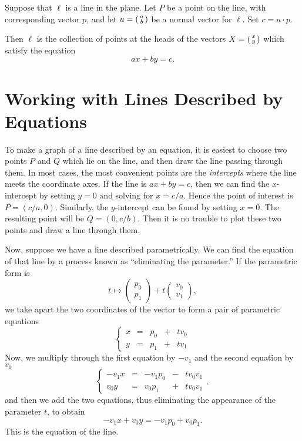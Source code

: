 \documentclass[00-livre-main.tex]{subfiles}
\begin{document}
\begin{theorem}
Suppose that $\ell$ is a line in the plane. Let $P$ be a point on the line, with corresponding vector $p$, and let $u=\left(\begin{smallmatrix} a \\ b \end{smallmatrix}\right)$ be a normal vector for $\ell$. Set $c=u\cdot p$.

Then $\ell$ is the collection of points at the heads of the vectors $X = \left(\begin{smallmatrix} x \\ y \end{smallmatrix}\right)$ which satisfy the equation
\[
ax+by=c.
\]
\end{theorem}

\section*{Working with Lines Described by Equations}

To make a graph of a line described by an equation, it is easiest to choose two points $P$ and $Q$ which lie on the line, and then draw the line passing through them. In most cases, the most convenient points are the \emph{intercepts} where the line meets the coordinate axes. If the line is $ax+by=c$, then we can find the $x$-intercept by setting $y=0$ and solving for $x=c/a$. Hence the point of interest is $P=(c/a,0)$. Similarly, the $y$-intercept can be found by setting $x=0$. The resulting point will be $Q=(0,c/b)$.
Then it is no trouble to plot these two points and draw a line through them.

Now, suppose we have a line described parametrically. We can find the equation of that line by a process known as ``eliminating the parameter.'' If the parametric form is
\[
t \mapsto \begin{pmatrix} p_0 \\ p_1 \end{pmatrix} + t \begin{pmatrix} v_0 \\ v_1 \end{pmatrix}, 
\]
we take apart the two coordinates of the vector to form a pair of parametric equations
\[
\left\{\begin{array}{rrrrr} x & = & p_0 & + & tv_0 \\ y & = & p_1 & + & tv_1 \end{array}\right.
\]
Now, we multiply through the first equation by $-v_1$ and the second equation by $v_0$
\[
\left\{\begin{array}{rrrrr} -v_1 x & = & -v_1 p_0 & - & tv_0 v_1 \\ v_0 y & = & v_0  p_1 & + & tv_0 v_1 \end{array}\right. ,
\]
and then we add the two equations, thus eliminating the appearance of the parameter $t$, to obtain
\[
-v_1 x + v_0 y = -v_1p_0 + v_0p_1.
\]
This is the equation of the line.
\end{document}

